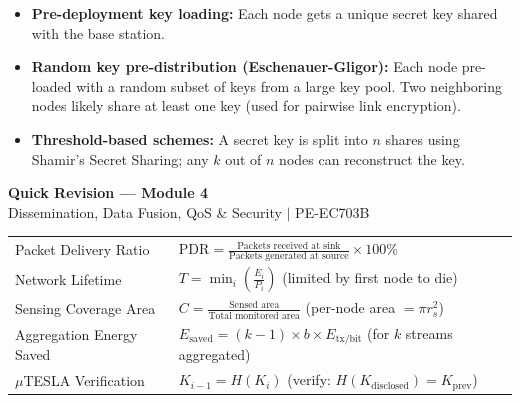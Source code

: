 \documentclass[12pt,a4paper]{article}
\renewcommand{\arraystretch}{1.45}
\begin{document}
\begin{itemize}[leftmargin=*, itemsep=3pt]
  \item \textbf{Pre-deployment key loading:} Each node gets a unique secret key shared with the base station.
  \item \textbf{Random key pre-distribution (Eschenauer-Gligor):} Each node pre-loaded with a random subset of keys from a large key pool. Two neighboring nodes likely share at least one key (used for pairwise link encryption).
  \item \textbf{Threshold-based schemes:} A secret key is split into $n$ shares using Shamir's Secret Sharing; any $k$ out of $n$ nodes can reconstruct the key.
\end{itemize}

\newpage
\begin{center}
  {\large\bfseries\color{myred} Quick Revision --- Module 4}\\[3pt]
  {\small\color{mydark} Dissemination, Data Fusion, QoS \& Security $|$ PE-EC703B}
\end{center}
\noindent{\color{myred}\rule{\linewidth}{1.2pt}}
\vspace{4pt}

\begin{tcolorbox}[formulabox, title={\textbf{Key Formulas and Metrics at a Glance}}]
\renewcommand{\arraystretch}{1.35}
\begin{tabularx}{\linewidth}{B{5.0cm} X}
Packet Delivery Ratio & $\text{PDR} = \displaystyle\frac{\text{Packets received at sink}}{\text{Packets generated at source}} \times 100\%$ \\[6pt]
Network Lifetime & $T = \displaystyle\min_i \left(\frac{E_i}{P_i}\right)$ \quad (limited by first node to die) \\[6pt]
Sensing Coverage Area & $C = \displaystyle\frac{\text{Sensed area}}{\text{Total monitored area}}$ \quad (per-node area $= \pi r_s^2$) \\[6pt]
Aggregation Energy Saved & $E_{\text{saved}} = (k-1) \times b \times E_{\text{tx/bit}}$ \quad (for $k$ streams aggregated) \\[6pt]
$\mu$TESLA Verification & $K_{i-1} = H(K_i)$ \quad (verify: $H(K_{\text{disclosed}}) = K_{\text{prev}}$)
\end{tabularx}
\end{tcolorbox}
\end{document}
